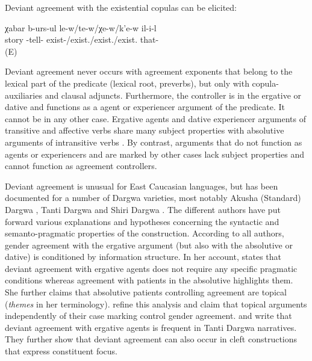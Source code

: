 Deviant agreement with the existential copulas can be elicited:

\begin{exe}
	\ex	\label{ex:telling a storyLOCCOP}
	\gll	χabar	b-urs-ul	le-w\slash		te-w\slash		χe-w\slash		k'e-w	il-i-l\\
		story	-tell-	exist-\slash 	exist.\slash 	exist.\slash	exist.	that-\\
	\glt	{} (E)
\end{exe}


Deviant agreement never occurs with agreement exponents that belong to the lexical part of the predicate (lexical root, preverbs), but only with copula-auxiliaries and clausal adjuncts. Furthermore, the controller is in the ergative or dative and functions as a agent or experiencer argument of the predicate. It cannot be in any other case. Ergative agents and dative experiencer arguments of transitive and affective verbs share many subject properties with absolutive arguments of intransitive verbs \citep{Forker2017, Forker2019}. By contrast, arguments that do not function as agents or experiencers and are marked by other cases lack subject properties and cannot function as agreement controllers.

Deviant agreement is unusual for East Caucasian languages, but has been documented for a number of Dargwa varieties, most notably Akusha (Standard) Dargwa \citep{vandenBerg1999, GanenkovForthcoming}, Tanti Dargwa \citep[450]{Sumbatova.Lander2014} and Shiri Dargwa \citep{Belyaev2016, Belyaev2017a, Belyaev2017b}. The different authors have put forward various explanations and hypotheses concerning the syntactic and semanto-pragmatic properties of the construction. According to all authors, gender agreement with the ergative argument (but also with the absolutive or dative) is conditioned by information structure. In her account, \citet{vandenBerg1999} states that deviant agreement with ergative agents does not require any specific pragmatic conditions whereas agreement with patients in the absolutive highlights them. She further claims that absolutive patients controlling agreement are topical (\textit{themes} in her terminology). \citet{Sumbatova.Lander2014} refine this analysis and claim that topical arguments independently of their case marking control gender agreement. \citet{Sumbatova2010} and \citet{Sumbatova.Lander2014} write that deviant agreement with ergative agents is frequent in Tanti Dargwa narratives. They further show that deviant agreement can also occur in cleft constructions that express constituent focus.




